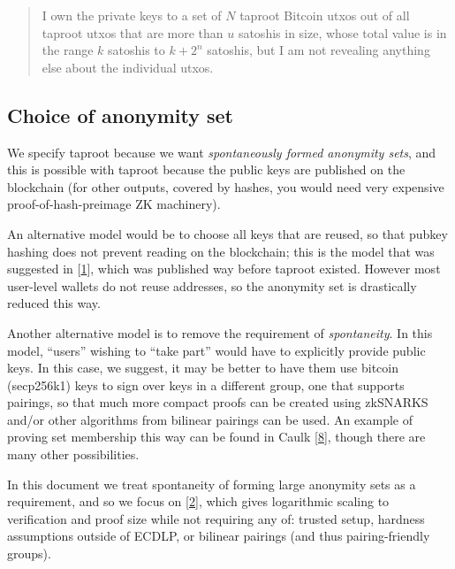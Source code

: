 \documentclass[10pt,a4paper]{article}
\begin{document}
\begin{quote}
I own the private keys to a set of $N$ taproot Bitcoin utxos out of all taproot utxos that are more than $u$ satoshis in size, whose total value is in the range $k$ satoshis to $k + 2^n$ satoshis, but I am not revealing anything else about the individual utxos.
\end{quote}

\subsection{Choice of anonymity set}

We specify taproot because we want \emph{spontaneously formed anonymity sets}, and this is possible with taproot because the public keys are published on the blockchain (for other outputs, covered by hashes, you would need very expensive proof-of-hash-preimage ZK machinery).

\vspace{5 pt}

An alternative model would be to choose all keys that are reused, so that pubkey hashing does not prevent reading on the blockchain; this is the model that was suggested in {[}\protect\hyperlink{anchor-1}{1}{]}, which was published way before taproot existed. However most user-level wallets do not reuse addresses, so the anonymity set is drastically reduced this way.

\vspace{5 pt}

Another alternative model is to remove the requirement of \emph{spontaneity}. In this model, ``users'' wishing to ``take part'' would have to explicitly provide public keys. In this case, we suggest, it may be better to have them use bitcoin (secp256k1) keys to sign over keys in a different group, one that supports pairings, so that much more compact proofs can be created using zkSNARKS and/or other algorithms from bilinear pairings can be used. An example of proving set membership this way can be found in Caulk {[}\protect\hyperlink{anchor-8}{8}{]}, though there are many other possibilities.

\vspace{5 pt}

In this document we treat spontaneity of forming large anonymity sets as a requirement, and so we focus on {[}\protect\hyperlink{anchor-2}{2}{]}, which gives logarithmic scaling to verification and proof size while not requiring any of: trusted setup, hardness assumptions outside of ECDLP, or bilinear pairings (and thus pairing-friendly groups).
\end{document}
